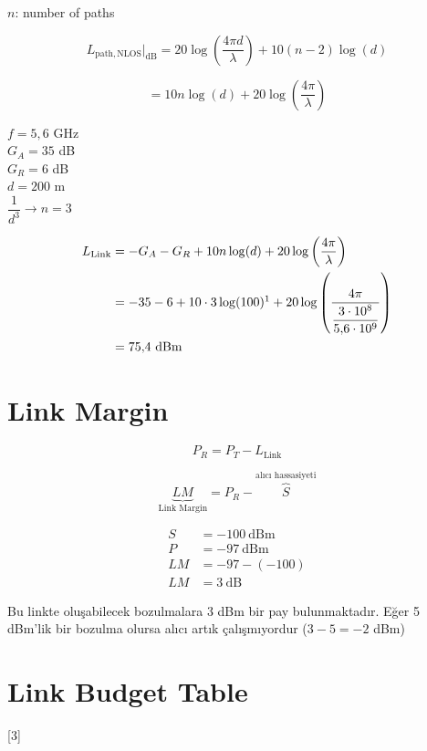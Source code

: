 \documentclass[11pt,a4paper]{article}
\begin{document}
$n$: number of paths

\[ L_{\mathrm{path,NLOS}}\big|_{\mathrm{dB}} = 20\log\left(\frac{4\pi d}{\lambda}\right) + 10(n-2)\log(d) \]

\[ = 10n\log(d) + 20\log\left(\frac{4\pi}{\lambda}\right) \]

\begin{ornek}
$f = 5{,}6$ GHz \\
$G_A = 35$ dB \\
$G_R = 6$ dB \\
$d = 200$ m \\
$\dfrac{1}{d^3} \rightarrow n = 3$
\end{ornek}

\begin{align*}
L_{\mathrm{Link}} &= -G_A - G_R + 10n\log(d) + 20\log\left(\frac{4\pi}{\lambda}\right) \\
&= -35 - 6 + 10\cdot 3\log(100)\footnotemark + 20\log\left(\frac{4\pi}{\dfrac{3\cdot 10^8}{5{,}6\cdot 10^9}}\right) \\
&= 75{,}4\ \mathrm{dBm}
\end{align*}

\section{Link Margin}

\[ P_R = P_T - L_{\mathrm{Link}} \]

\[ \underbrace{LM}_{\text{Link Margin}} = P_R - \overbrace{S}^{\text{alıcı hassasiyeti}} \]

\begin{align*}
S &= -100\ \mathrm{dBm} \\
P &= -97\ \mathrm{dBm} \\
LM &= -97 - (-100) \\
LM &= 3\ \mathrm{dB}
\end{align*}

Bu linkte oluşabilecek bozulmalara 3 dBm bir pay bulunmaktadır. Eğer 5 dBm'lik bir bozulma olursa alıcı artık çalışmıyordur ($3-5 = -2$ dBm)

\section{Link Budget Table}

[3]
\end{document}
